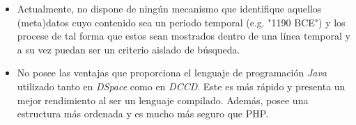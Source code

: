 \documentclass[
]{article}
\providecommand{\tightlist}{%
  \setlength{\itemsep}{0pt}\setlength{\parskip}{0pt}}
\begin{document}
\begin{itemize}
\tightlist
\item
  Actualmente, no dispone de ningún mecanismo que identifique aquellos
  (meta)datos cuyo contenido sea un periodo temporal (e.g. "1190 BCE") y
  los procese de tal forma que estos sean mostrados dentro de una línea
  temporal y a su vez puedan ser un criterio aislado de búsqueda.
\item
  No posee las ventajas que proporciona el lenguaje de programación
  \emph{Java} utilizado tanto en \emph{DSpace} como en \emph{DCCD}. Este
  es más rápido y presenta un mejor rendimiento al ser un lenguaje
  compilado. Además, posee una estructura más ordenada y es mucho más
  seguro que PHP.
\end{itemize}
\end{document}
